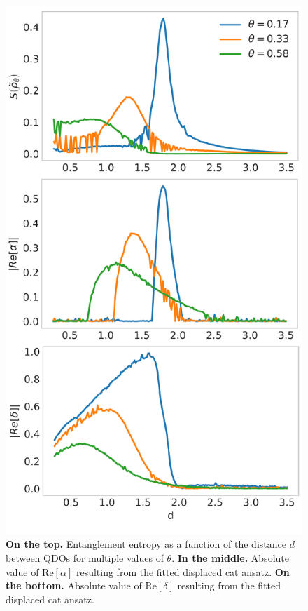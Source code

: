 \documentclass[reprint, amsmath, amssymb, floatfix, aps, pra]{revtex4-2}
\begin{document}
    \begin{figure}[h]
        \hspace{-0.5cm}
        \centering
        \includegraphics[scale=0.46]{figures/tripleplot.pdf}
        \caption{\label{fig:entropy_correlation}\textbf{On the top.} Entanglement entropy as a function of the distance $d$ between QDOs for multiple values of $\theta$. \textbf{In the middle.} Absolute value of $\mathrm{Re}\left[\alpha\right]$ resulting from the fitted displaced cat ansatz. \textbf{On the bottom.} Absolute value of $\mathrm{Re}\left[\delta\right]$ resulting from the fitted displaced cat ansatz.}
    \end{figure}
\end{document}
